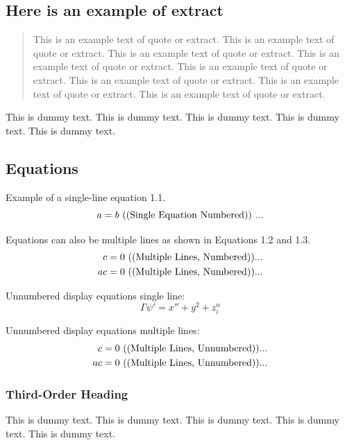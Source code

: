 \documentclass{jpp}
\begin{document}
\subsection{Here is an example of extract}

\begin{quotation}
\noindent This is an example text of quote or extract. This is an example text of quote or extract.
This is an example text of quote or extract. This is an example text of quote or extract.
This is an example text of quote or extract. This is an example text of quote or extract.
This is an example text of quote or extract. This is an example text of quote or extract.
\end{quotation}

This is dummy text. This is dummy text. This is dummy text. This is dummy text. This is
dummy text.

\subsection{Equations}

Example of a single-line equation 1.1.
\begin{equation}
a = b\ \text{((Single Equation Numbered)) } \hfill. . .
\end{equation}


Equations can also be multiple lines as shown in Equations 1.2 and 1.3.
\begin{align}
c &= 0\ \text{((Multiple Lines, Numbered))}\hfill . . .\\
ac &= 0\ \text{((Multiple Lines, Numbered))} \hfill . . .
\end{align}

Unnumbered display equations single line:
\begin{equation*}
\Gamma \psi' = x'' + y^2 +z _i^n
\end{equation*}

Unnumbered display equations multiple lines:
\begin{align*}
c &= 0\ \text{((Multiple Lines, Unnumbered))}\hfill . . .\\
ac &= 0\ \text{((Multiple Lines, Unnumbered))} \hfill . . .
\end{align*}

\subsubsection{Third-Order Heading}

This is dummy text. This is dummy text. This is dummy text. This is dummy text. This is
dummy text.
\end{document}
